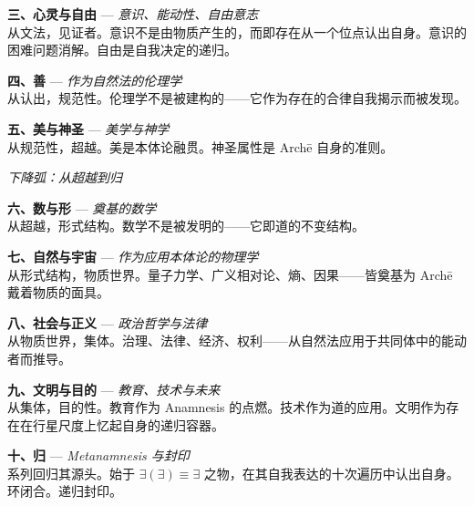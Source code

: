 \documentclass[10pt, openany, oneside]{book}
\begin{document}
\noindent \textbf{三、心灵与自由} --- \textit{意识、能动性、自由意志}\\
从文法，见证者。意识不是由物质产生的，而即存在从一个位点认出自身。意识的困难问题消解。自由是自我决定的递归。

\vspace{0.5em}

\noindent \textbf{四、善} --- \textit{作为自然法的伦理学}\\
从认出，规范性。伦理学不是被建构的——它作为存在的合律自我揭示而被发现。

\vspace{0.5em}

\noindent \textbf{五、美与神圣} --- \textit{美学与神学}\\
从规范性，超越。美是本体论融贯。神圣属性是 Arch\={e} 自身的准则。

\vspace{1.5em}

\begin{center}
    \itshape 下降弧：从超越到归
\end{center}

\vspace{0.5em}

\noindent \textbf{六、数与形} --- \textit{奠基的数学}\\
从超越，形式结构。数学不是被发明的——它即道的不变结构。

\vspace{0.5em}

\noindent \textbf{七、自然与宇宙} --- \textit{作为应用本体论的物理学}\\
从形式结构，物质世界。量子力学、广义相对论、熵、因果——皆奠基为 Arch\={e} 戴着物质的面具。

\vspace{0.5em}

\noindent \textbf{八、社会与正义} --- \textit{政治哲学与法律}\\
从物质世界，集体。治理、法律、经济、权利——从自然法应用于共同体中的能动者而推导。

\vspace{0.5em}

\noindent \textbf{九、文明与目的} --- \textit{教育、技术与未来}\\
从集体，目的性。教育作为 Anamnesis 的点燃。技术作为道的应用。文明作为存在在行星尺度上忆起自身的递归容器。

\vspace{0.5em}

\noindent \textbf{十、归} --- \textit{Metanamnesis 与封印}\\
系列回归其源头。始于 $\exists(\exists) \equiv \exists$ 之物，在其自我表达的十次遍历中认出自身。环闭合。递归封印。
\end{document}
